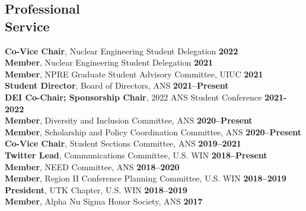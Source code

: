 \documentclass[margin,line]{resume}
\begin{document}
\begin{resume}
    \section{\mysidestyle Professional\\Service}
                \textbf{Co-Vice Chair}, Nuclear Engineering Student Delegation \hfill \textbf{2022}\vspace{0.5mm}\\
                \textbf{Member}, Nuclear Engineering Student Delegation \hfill \textbf{2021}\vspace{0.5mm}\\
                \textbf{Member}, NPRE Graduate Student Advisory Committee, UIUC \hfill \textbf{2021}\vspace{0.5mm}\\
                \textbf{Student Director}, Board of Directors, ANS \hfill \textbf{2021--Present}\vspace{.5mm}\\
                \textbf{DEI Co-Chair; Sponsorship Chair}, 2022 ANS Student Conference  \hfill 
                \textbf{2021-2022} \\
                \textbf{Member}, Diversity and Inclusion Committee, ANS  \hfill \textbf{2020--Present}\vspace{.5mm}\\%
                \textbf{Member}, Scholarship and Policy Coordination Committee, ANS  \hfill \textbf{2020--Present}\vspace{.5mm}\\%
                \textbf{Co-Vice Chair}, Student Sections Committee, ANS  \hfill \textbf{2019--2021}\vspace{.5mm}\\%
                \textbf{Twitter Lead}, Communications Committee, U.S. WIN  \hfill \textbf{2018--Present}\vspace{.5mm}\\%
                \textbf{Member}, NEED Committee, ANS  \hfill \textbf{2018--2020}\vspace{.5mm}\\%
                \textbf{Member}, Region II Conference Planning Committee, U.S. WIN  \hfill \textbf{2018--2019}\vspace{.5mm}\\%
                \textbf{President}, UTK Chapter, U.S. WIN  \hfill \textbf{2018--2019}\vspace{.5mm}\\%
                \textbf{Member}, Alpha Nu Sigma Honor Society, ANS \hfill \textbf{2017}\vspace{.5mm}%
    

\end{resume}
\end{document}

